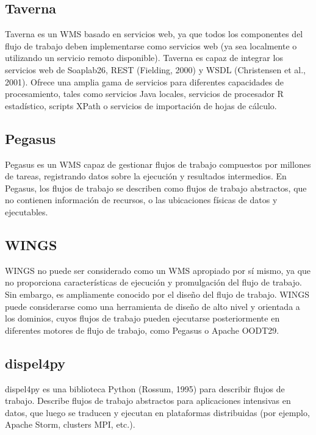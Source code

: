 \subsection{Taverna}	
Taverna \cite{DBLP:journals/bioinformatics/OinnAFMSGCGPWL04} es un WMS basado en servicios web, ya que todos los componentes del flujo de trabajo deben implementarse como servicios web (ya sea localmente o utilizando un servicio remoto disponible). Taverna es capaz de integrar los servicios web de Soaplab26, REST (Fielding, 2000) y WSDL (Christensen et al., 2001). Ofrece una amplia gama de servicios para diferentes capacidades de procesamiento, tales como servicios Java locales, servicios de procesador R estadístico, scripts XPath o servicios de importación de hojas de cálculo.
\subsection{Pegasus}
Pegasus \cite{deelman2004pegasus} es un WMS capaz de gestionar flujos de trabajo compuestos por millones de tareas, registrando datos sobre la ejecución y resultados intermedios. En Pegasus, los flujos de trabajo se describen como flujos de trabajo abstractos, que no contienen información de recursos, o las ubicaciones físicas de datos y ejecutables.
\subsection{WINGS} 
WINGS \cite{DBLP:journals/expert/GilRKGGMD11}  no puede ser considerado como un WMS apropiado por sí mismo, ya que no proporciona características de ejecución y promulgación del flujo de trabajo. Sin embargo, es ampliamente conocido por el diseño del flujo de trabajo. WINGS puede considerarse como una herramienta de diseño de alto nivel y orientada a los dominios, cuyos flujos de trabajo pueden ejecutarse posteriormente en diferentes motores de flujo de trabajo, como Pegasus o Apache OODT29.
\subsection{dispel4py}
dispel4py \cite{DBLP:conf/eScience/FilgueiraKAKSS15}  es una biblioteca Python (Rossum, 1995) para describir flujos de trabajo. Describe flujos de trabajo abstractos para aplicaciones intensivas en datos, que luego se traducen y ejecutan en plataformas distribuidas (por ejemplo, Apache Storm, clusters MPI, etc.).

